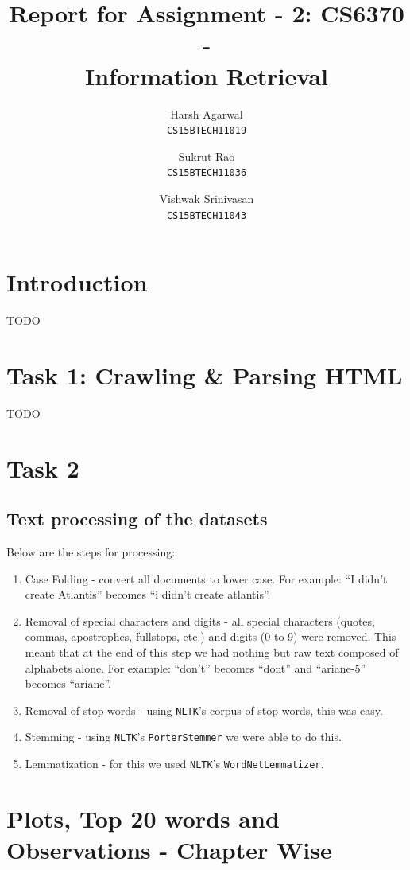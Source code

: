 \documentclass{article}
\title{Report for Assignment - 2: CS6370 - \\Information Retrieval}
\author{
Harsh Agarwal\\\texttt{CS15BTECH11019}
\and
Sukrut Rao\\\texttt{CS15BTECH11036}
\and
Vishwak Srinivasan\\\texttt{CS15BTECH11043}
}
\date{}
\begin{document}
\maketitle

\section{Introduction}
\begin{flushleft}
	TODO
\end{flushleft}

\section{Task 1: Crawling \& Parsing HTML}
\begin{flushleft}
	TODO
\end{flushleft}
\newpage

\section{Task 2}
\subsection{Text processing of the datasets}
\begin{flushleft}
	Below are the steps for processing:
	\begin{enumerate}
		\item Case Folding - convert all documents to lower case. For example: ``I didn't create Atlantis'' becomes ``i didn't create atlantis''.
		\item Removal of special characters and digits - all special characters (quotes, commas, apostrophes, fullstops, etc.) and digits (0 to 9) were removed. This meant that at the end of this step we had nothing but raw text composed of alphabets alone. For example: ``don't'' becomes ``dont'' and ``ariane-5'' becomes ``ariane''.
		\item Removal of stop words - using \texttt{NLTK}'s corpus of stop words, this was easy.
		\item Stemming - using \texttt{NLTK}'s \texttt{PorterStemmer} we were able to do this.
		\item Lemmatization - for this we used \texttt{NLTK}'s \texttt{WordNetLemmatizer}.
	\end{enumerate}
\end{flushleft}

\section{Plots, Top 20 words and Observations - Chapter Wise}
\end{document}
